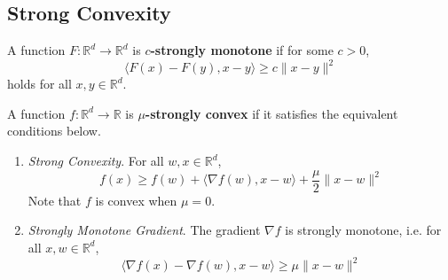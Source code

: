 \subsection{Strong Convexity}

	\begin{definition}
		A function $F: \mathbb{R}^d \to \mathbb{R}^d$ is \textbf{$c$-strongly monotone} if for some $c > 0$, 
		\begin{equation}
			\langle F(x) - F(y), x - y \rangle \geq c \|x - y\|^2
		\end{equation}
		holds for all $x, y \in \mathbb{R}^d$. 
	\end{definition}

	\begin{definition}
		A function $f: \mathbb{R}^d \to \mathbb{R}$ is \textbf{$\mu$-strongly convex} if it satisfies the equivalent conditions below. 
		\begin{enumerate}
		  \item \textit{Strong Convexity}. For all $w, x \in \mathbb{R}^d$, 
				\begin{equation}
					f(x) \geq f(w) + \langle \nabla f(w), x - w \rangle + \frac{\mu}{2} \|x - w\|^2
				\end{equation}
				Note that $f$ is convex when $\mu = 0$. 

			\item \textit{Strongly Monotone Gradient}. The gradient $\nabla f$ is strongly monotone, i.e. for all $x, w \in \mathbb{R}^d$, 
				\begin{equation}
				  \langle \nabla f(x) - \nabla f(w), x - w \rangle \geq \mu \|x - w\|^2
				\end{equation}
		\end{enumerate}
	\end{definition} 
